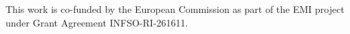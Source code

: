 This work is co-funded by the European Commission as part of
the EMI project under
Grant Agreement INFSO-RI-261611.
